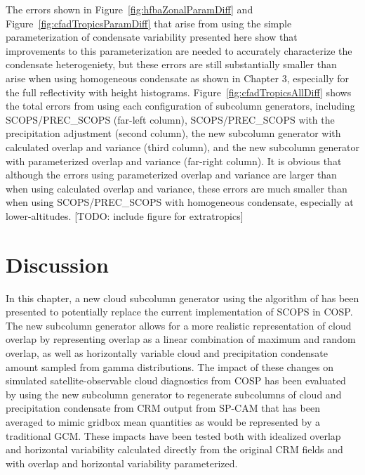 The errors shown in Figure~\ref{fig:hfbaZonalParamDiff} and
Figure~\ref{fig:cfadTropicsParamDiff} that arise from using the simple
parameterization of condensate variability presented here show that
improvements to this parameterization are needed to accurately
characterize the condensate heterogeniety, but these errors are still
substantially smaller than arise when using homogeneous condensate as
shown in Chapter 3, especially for the full reflectivity with height
histograms. Figure~\ref{fig:cfadTropicsAllDiff} shows the total errors
from using each configuration of subcolumn generators, including
SCOPS/PREC\_SCOPS (far-left column), SCOPS/PREC\_SCOPS with the
precipitation adjustment (second column), the new subcolumn generator
with calculated overlap and variance (third column), and the new
subcolumn generator with parameterized overlap and variance (far-right
column). It is obvious that although the errors using parameterized
overlap and variance are larger than when using calculated overlap and
variance, these errors are much smaller than when using
SCOPS/PREC\_SCOPS with homogeneous condensate, especially at
lower-altitudes. {[}TODO: include figure for extratropics{]}

\section{Discussion}\label{sec:subgrid2Discussion}

In this chapter, a new cloud subcolumn generator using the algorithm of
\citet{raisanen_et_al_2004} has been presented to potentially replace
the current implementation of SCOPS in COSP. The new subcolumn generator
allows for a more realistic representation of cloud overlap by
representing overlap as a linear combination of maximum and random
overlap, as well as horizontally variable cloud and precipitation
condensate amount sampled from gamma distributions. The impact of these
changes on simulated satellite-observable cloud diagnostics from COSP
has been evaluated by using the new subcolumn generator to regenerate
subcolumns of cloud and precipitation condensate from CRM output from
SP-CAM that has been averaged to mimic gridbox mean quantities as would
be represented by a traditional GCM. These impacts have been tested both
with idealized overlap and horizontal variability calculated directly
from the original CRM fields and with overlap and horizontal variability
parameterized.

